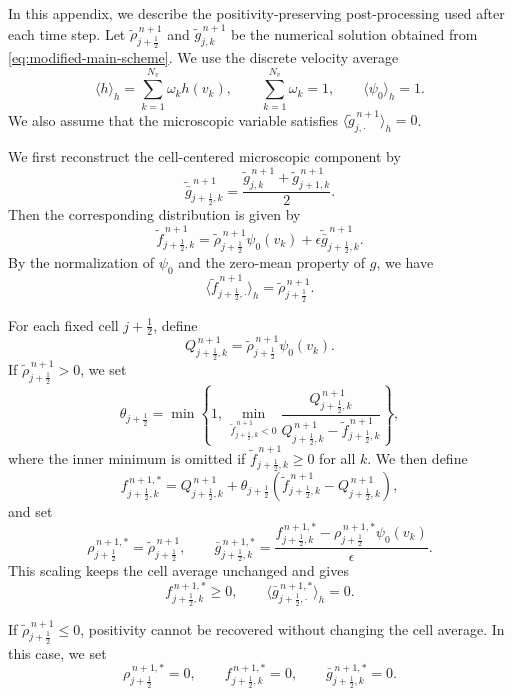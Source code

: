 \documentclass[11pt,twoside]{article}
\numberwithin{equation}{section}
\theoremstyle{plain}
\theoremstyle{nonumberplain}
\begin{document}
In this appendix, we describe the positivity-preserving post-processing
used after each time step. Let
\(\tilde{\rho}_{j+\frac12}^{\,n+1}\) and
\(\tilde g_{j,k}^{\,n+1}\) be the numerical solution obtained from
\eqref{eq:modified-main-scheme}. We use the discrete velocity average
\[
    \langle h\rangle_h
    =
    \sum_{k=1}^{N_v}\omega_k h(v_k),
    \qquad
    \sum_{k=1}^{N_v}\omega_k=1,
    \qquad
    \langle \psi_0\rangle_h=1 .
\]
We also assume that the microscopic variable satisfies
\(\langle \tilde g_{j,\cdot}^{\,n+1}\rangle_h=0\).

We first reconstruct the cell-centered microscopic component by
\[
    \tilde{\bar g}_{j+\frac12,k}^{\,n+1}
    =
    \frac{
    \tilde g_{j,k}^{\,n+1}
    +
    \tilde g_{j+1,k}^{\,n+1}
    }{2}.
\]
Then the corresponding distribution is given by
\[
    \tilde f_{j+\frac12,k}^{\,n+1}
    =
    \tilde\rho_{j+\frac12}^{\,n+1}\psi_0(v_k)
    +
    \epsilon \tilde{\bar g}_{j+\frac12,k}^{\,n+1}.
\]
By the normalization of \(\psi_0\) and the zero-mean property of \(g\),
we have
\[
    \langle \tilde f_{j+\frac12,\cdot}^{\,n+1}\rangle_h
    =
    \tilde\rho_{j+\frac12}^{\,n+1}.
\]

For each fixed cell \(j+\frac12\), define
\[
    Q_{j+\frac12,k}^{\,n+1}
    =
    \tilde\rho_{j+\frac12}^{\,n+1}\psi_0(v_k).
\]
If \(\tilde\rho_{j+\frac12}^{\,n+1}>0\), we set
\[
    \theta_{j+\frac12}
    =
    \min\left\{
    1,\,
    \min_{\tilde f_{j+\frac12,k}^{\,n+1}<0}
    \frac{
    Q_{j+\frac12,k}^{\,n+1}
    }{
    Q_{j+\frac12,k}^{\,n+1}
    -
    \tilde f_{j+\frac12,k}^{\,n+1}
    }
    \right\},
\]
where the inner minimum is omitted if
\(\tilde f_{j+\frac12,k}^{\,n+1}\ge0\) for all \(k\). We then define
\[
    f_{j+\frac12,k}^{\,n+1,*}
    =
    Q_{j+\frac12,k}^{\,n+1}
    +
    \theta_{j+\frac12}
    \left(
    \tilde f_{j+\frac12,k}^{\,n+1}
    -
    Q_{j+\frac12,k}^{\,n+1}
    \right),
\]
and set
\[
    \rho_{j+\frac12}^{\,n+1,*}
    =
    \tilde\rho_{j+\frac12}^{\,n+1},
    \qquad
    \bar g_{j+\frac12,k}^{\,n+1,*}
    =
    \frac{
    f_{j+\frac12,k}^{\,n+1,*}
    -
    \rho_{j+\frac12}^{\,n+1,*}\psi_0(v_k)
    }{\epsilon}.
\]
This scaling keeps the cell average unchanged and gives
\[
    f_{j+\frac12,k}^{\,n+1,*}\ge0,
    \qquad
    \langle \bar g_{j+\frac12,\cdot}^{\,n+1,*}\rangle_h=0 .
\]

If \(\tilde\rho_{j+\frac12}^{\,n+1}\le0\), positivity cannot be recovered
without changing the cell average. In this case, we set
\[
    \rho_{j+\frac12}^{\,n+1,*}=0,
    \qquad
    f_{j+\frac12,k}^{\,n+1,*}=0,
    \qquad
    \bar g_{j+\frac12,k}^{\,n+1,*}=0 .
\]
\end{document}
